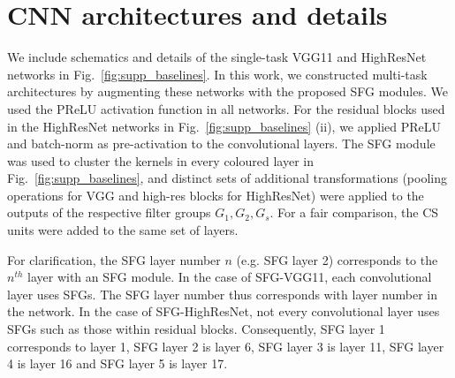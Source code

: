 \section{CNN architectures and details}
We include schematics and details of the single-task VGG11 \cite{vgg} and HighResNet \cite{wenqi} networks in Fig.~\ref{fig:supp_baselines}. In this work, we constructed multi-task architectures by augmenting these networks with the proposed SFG modules. We used the PReLU activation function \cite{prelu} in all networks. For the residual blocks used in the HighResNet networks in Fig.~\ref{fig:supp_baselines} (ii), we applied PReLU and batch-norm as pre-activation \cite{preactivation} to the convolutional layers. The SFG module was used to cluster the kernels in every coloured layer in Fig.~\ref{fig:supp_baselines}, and distinct sets of additional transformations (pooling operations for VGG and high-res blocks for HighResNet) were applied to the outputs of the respective filter groups $G_{1}, G_{2}, G_{s}$. For a fair comparison, the CS units \cite{MisraCrossMTL16} were added to the same set of layers.

For clarification, the SFG layer number $n$ (e.g. SFG layer 2) corresponds to the $n^{th}$ layer with an SFG module. In the case of SFG-VGG11, each convolutional layer uses SFGs. The SFG layer number thus corresponds with layer number in the network. In the case of SFG-HighResNet, not every convolutional layer uses SFGs such as those within residual blocks. Consequently, SFG layer 1 corresponds to layer 1, SFG layer 2 is layer 6, SFG layer 3 is layer 11, SFG layer 4 is layer 16 and SFG layer 5 is layer 17.

